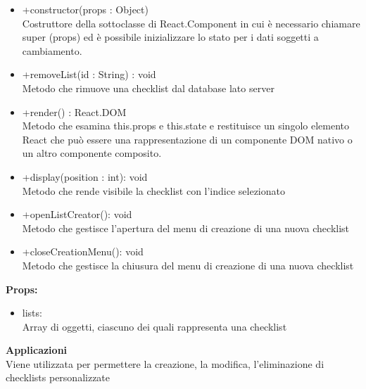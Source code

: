 \begin{itemize}

\item +constructor(props : Object)
\\
Costruttore della sottoclasse di React.Component in cui è necessario chiamare super (props) ed è possibile inizializzare lo stato per i dati soggetti a cambiamento.

\item +removeList(id : String) : void  
\\
Metodo che rimuove una checklist dal database lato server

\item +render() : React.DOM 
\\
Metodo che esamina this.props e this.state e restituisce un singolo elemento React che può essere una rappresentazione di un componente DOM nativo o un altro componente composito.

\item +display(position : int): void
\\
Metodo che rende visibile la checklist con l'indice selezionato

\item +openListCreator(): void
\\
Metodo che gestisce l'apertura del menu di creazione di una nuova checklist
\item +closeCreationMenu(): void
\\
Metodo che gestisce la chiusura del menu di creazione di una nuova checklist

\end{itemize}

\textbf{Props:} 
\begin{itemize}

\item lists: 
\\
Array di oggetti, ciascuno dei quali rappresenta una checklist


\end{itemize} 


\textbf{Applicazioni}\\
Viene utilizzata per permettere la creazione, la modifica, l'eliminazione di checklists personalizzate 


\clearpage

